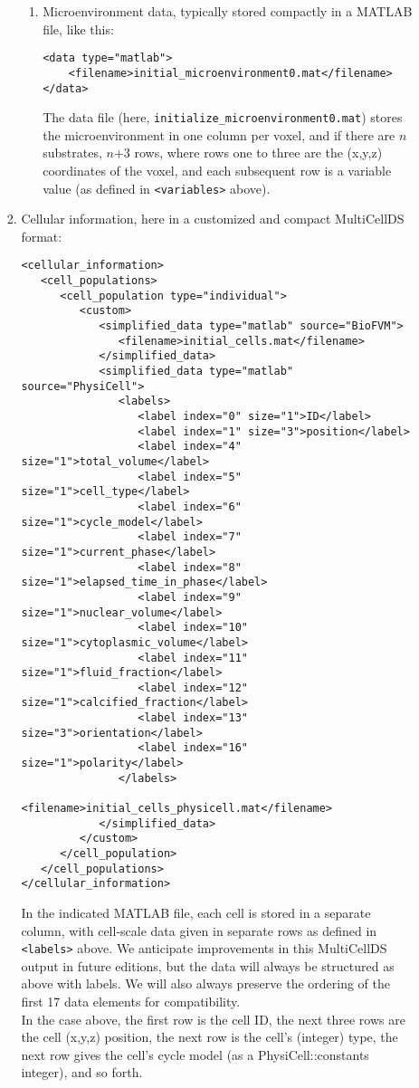 \documentclass[12pt]{article}
\renewcommand{\v}{\verb}
\begin{document}
\begin{enumerate}
\begin{enumerate}
\begin{enumerate}
\begin{enumerate}
\item 
Microenvironment data, typically stored compactly in a MATLAB file, like this: 
\begin{verbatim}
<data type="matlab">
    <filename>initial_microenvironment0.mat</filename>
</data>
\end{verbatim}
The data file (here, \v|initialize_microenvironment0.mat|) stores the 
microenvironment in one column per voxel, and if there are $n$ substrates, 
$n$+3 rows, where rows one to three are the (x,y,z) coordinates of the voxel, 
and each subsequent row is a variable value (as defined in 
\v|<variables>| above). 

\end{enumerate}

\item 
Cellular information, here in a customized and compact MultiCellDS 
format:  
\begin{verbatim}
<cellular_information>
   <cell_populations>
      <cell_population type="individual">
         <custom>
            <simplified_data type="matlab" source="BioFVM">
               <filename>initial_cells.mat</filename>
            </simplified_data>
            <simplified_data type="matlab" source="PhysiCell">
               <labels>
                  <label index="0" size="1">ID</label>
                  <label index="1" size="3">position</label>
                  <label index="4" size="1">total_volume</label>
                  <label index="5" size="1">cell_type</label>
                  <label index="6" size="1">cycle_model</label>
                  <label index="7" size="1">current_phase</label>
                  <label index="8" size="1">elapsed_time_in_phase</label>
                  <label index="9" size="1">nuclear_volume</label>
                  <label index="10" size="1">cytoplasmic_volume</label>
                  <label index="11" size="1">fluid_fraction</label>
                  <label index="12" size="1">calcified_fraction</label>
                  <label index="13" size="3">orientation</label>
                  <label index="16" size="1">polarity</label>
               </labels>
               <filename>initial_cells_physicell.mat</filename>
            </simplified_data>
         </custom>
      </cell_population>
   </cell_populations>
</cellular_information>
\end{verbatim}
In the indicated MATLAB file, each cell is stored in a separate column, 
with cell-scale data given in separate rows as defined in 
\v|<labels>| above. We anticipate improvements in this MultiCellDS 
output in future editions, but the data will always be structured as 
above with labels. We will also always preserve the ordering of the first 
17 data elements for compatibility. \\

In the case above, the first row is the cell ID, the next three rows 
are the cell (x,y,z) position, the next row is the cell's (integer) type, 
the next row gives the cell's cycle model (as a PhysiCell::constants integer), 
and so forth. 
\end{enumerate}
\end{enumerate}
\end{enumerate}
\end{document}
